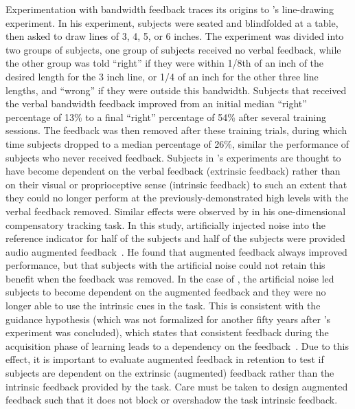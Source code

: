 Experimentation with bandwidth feedback traces its origins to \citeauthor{thorndike_law_1927}'s \citeyear{thorndike_law_1927} line-drawing experiment.
In his experiment, subjects were seated and blindfolded at a table, then asked to draw lines of 3, 4, 5, or 6 inches.
The experiment was divided into two groups of subjects, one group of subjects received no verbal feedback, while the other group was told ``right'' if they were within 1/8th of an inch of the desired length for the 3 inch line, or 1/4 of an inch for the other three line lengths, and ``wrong'' if they were outside this bandwidth.
Subjects that received the verbal bandwidth feedback improved from an initial median ``right'' percentage of 13\% to a final ``right'' percentage of 54\% after several training sessions.
The feedback was then removed after these training trials, during which time subjects dropped to a median percentage of 26\%, similar the performance of subjects who never received feedback.
Subjects in \citeauthor{thorndike_law_1927}'s experiments are thought to have become dependent on the verbal feedback (extrinsic feedback) rather than on their visual or proprioceptive sense (intrinsic feedback) to such an extent that they could no longer perform at the previously-demonstrated high levels with the verbal feedback removed.
Similar effects were observed by \citeauthor{kinkade1963differential} in his one-dimensional compensatory tracking task.
In this study, artificially injected noise into the reference indicator for half of the subjects and half of the subjects were provided audio augmented feedback~\citep{kinkade1963differential}.
He found that augmented feedback always improved performance, but that subjects with the artificial noise could not retain this benefit when the feedback was removed.
In the case of \citet{kinkade1963differential}, the artificial noise led subjects to become dependent on the augmented feedback and they were no longer able to use the intrinsic cues in the task.
This is consistent with the guidance hypothesis (which was not formalized for another fifty years after \citeauthor{thorndike_law_1927}'s experiment was concluded), which states that consistent feedback during the acquisition phase of learning leads to a dependency on the feedback~\citep{salmoni_knowledge_1984}.
Due to this effect, it is important to evaluate augmented feedback in retention to test if subjects are dependent on the extrinsic (augmented) feedback rather than the intrinsic feedback provided by the task.
Care must be taken to design augmented feedback such that it does not block or overshadow the task intrinsic feedback.

